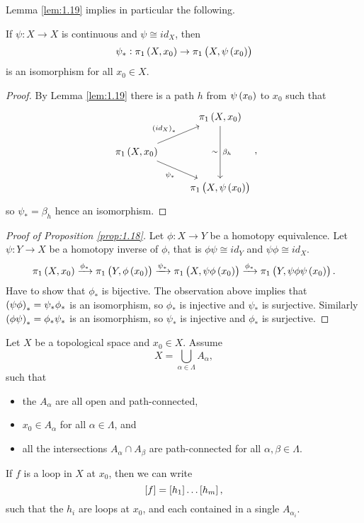 Lemma \ref{lem:1.19} implies in particular the following.

\begin{corollary}
If $ \psi : X \to X $ is continuous and $ \psi \cong id_X $, then
$$ \psi_* : \pi_1\br{X, x_0} \to \pi_1\br{X, \psi\br{x_0}} $$
is an isomorphism for all $ x_0 \in X $.
\end{corollary}

\begin{proof}
By Lemma \ref{lem:1.19} there is a path $ h $ from $ \psi\br{x_0} $ to $ x_0 $ such that
$$
\begin{tikzcd}
& \pi_1\br{X, x_0} \arrow{dd}{\beta_h}[swap]{\sim} \\
\pi_1\br{X, x_0} \arrow{ur}{\br{id_X}_*} \arrow[swap]{dr}{\psi_*} & \\
& \pi_1\br{X, \psi\br{x_0}}
\end{tikzcd},
$$
so $ \psi_* = \beta_h $ hence an isomorphism.
\end{proof}

\begin{proof}[Proof of Proposition \ref{prop:1.18}]
Let $ \phi : X \to Y $ be a homotopy equivalence. Let $ \psi : Y \to X $ be a homotopy inverse of $ \phi $, that is $ \phi\psi \cong id_Y $ and $ \psi\phi \cong id_X $.
$$ \pi_1\br{X, x_0} \xrightarrow{\phi_*} \pi_1\br{Y, \phi\br{x_0}} \xrightarrow{\psi_*} \pi_1\br{X, \psi\phi\br{x_0}} \xrightarrow{\phi_*} \pi_1\br{Y, \psi\phi\psi\br{x_0}}. $$
Have to show that $ \phi_* $ is bijective. The observation above implies that $ \br{\psi\phi}_* = \psi_*\phi_* $ is an isomorphism, so $ \phi_* $ is injective and $ \psi_* $ is surjective. Similarly $ \br{\phi\psi}_* = \phi_*\psi_* $ is an isomorphism, so $ \psi_* $ is injective and $ \phi_* $ is surjective.
\end{proof}

\begin{lemma}
\label{lem:1.15}
Let $ X $ be a topological space and $ x_0 \in X $. Assume
$$ X = \bigcup_{\alpha \in \Lambda} A_\alpha, $$
such that
\begin{itemize}
\item the $ A_\alpha $ are all open and path-connected,
\item $ x_0 \in A_\alpha $ for all $ \alpha \in \Lambda $, and
\item all the intersections $ A_\alpha \cap A_\beta $ are path-connected for all $ \alpha, \beta \in \Lambda $.
\end{itemize}
If $ f $ is a loop in $ X $ at $ x_0 $, then we can write
$$ \sbr{f} = \sbr{h_1} \dots \sbr{h_m}, $$
such that the $ h_i $ are loops at $ x_0 $, and each contained in a single $ A_{\alpha_i} $.
\end{lemma}

